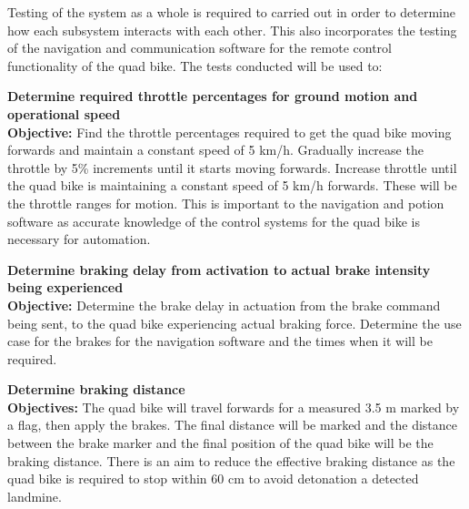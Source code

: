 \documentclass[main.tex]{subfiles}
\begin{document}
\begin{appendices}
\medskip\noindent 
Testing of the system as a whole is required to carried out in order to determine how each subsystem interacts with each other. This also incorporates the testing of the navigation and communication software for the remote control functionality of the quad bike. The tests conducted will be used to:

\begin{qb}
\textbf{Determine required throttle percentages for ground motion and operational speed}\\
\textbf{Objective:} Find the throttle percentages required to get the quad bike moving forwards and maintain a constant speed of 5 km/h. Gradually increase the throttle by 5\% increments until it starts moving forwards. Increase throttle until the quad bike is maintaining a constant speed of 5 km/h forwards. These will be the throttle ranges for motion. This is important to the navigation and potion software as accurate knowledge of the control systems for the quad bike is necessary for automation. 

\end{qb}

\begin{qb}
\textbf{Determine braking delay from activation to actual brake intensity being experienced}\\
\textbf{Objective:} Determine the brake delay in actuation from the brake command being sent, to the quad bike experiencing actual braking force. Determine the use case for the brakes for the navigation software and the times when it will be required.

\end{qb}

\begin{qb}
\textbf{Determine braking distance}\\
\textbf{Objectives:} The quad bike will travel forwards for a measured 3.5 m marked by a flag, then apply the brakes. The final distance will be marked and the distance between the brake marker and the final position of the quad bike will be the braking distance. There is an aim to reduce the effective braking distance as the quad bike is required to stop within 60 cm to avoid detonation a detected landmine. 


\end{qb}
\end{appendices}
\end{document}

